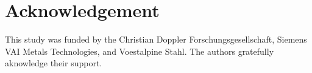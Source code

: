 \chapter*{Acknowledgement}
\label{cap:acknowledgement}
This study was funded by the Christian Doppler Forschungsgesellschaft, Siemens
VAI Metals Technologies, and Voestalpine Stahl. The authors gratefully
aknowledge their support.